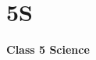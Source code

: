 \label{3 C5 Science}
    \section{5S}
    \begin{frame}
    \begin{center}
    \begin{Huge}
        \textbf{Class 5 Science}
    \end{Huge}
    \end{center}
    \end{frame}
 
    